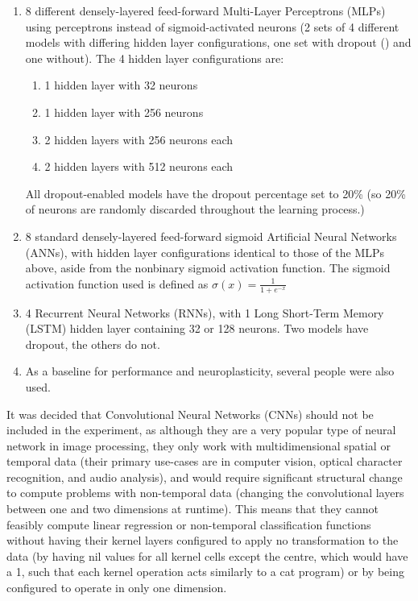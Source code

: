 \documentclass[]{report}
\begin{document}
\begin{enumerate}
	\item 8 different densely-layered feed-forward Multi-Layer Perceptrons (MLPs) using perceptrons instead of sigmoid-activated neurons (2 sets of 4 different models with differing hidden layer configurations, one set with dropout (\cite{dropout14}) and one without).
	\newline
	The 4 hidden layer configurations are:
	\begin{enumerate}
		\item 1 hidden layer with 32 neurons
		\item 1 hidden layer with 256 neurons
		\item 2 hidden layers with 256 neurons each
		\item 2 hidden layers with 512 neurons each
	\end{enumerate}
	All dropout-enabled models have the dropout percentage set to 20\% (so 20\% of neurons are randomly discarded throughout the learning process.)
	\item 8 standard densely-layered feed-forward sigmoid Artificial Neural Networks (ANNs), with hidden layer configurations identical to those of the MLPs above, aside from the nonbinary sigmoid activation function.
	\newline
	The sigmoid activation function used is defined as \(\sigma(x) = \frac{1}{1+e^{-x}}\)
	\item 4 Recurrent Neural Networks (RNNs), with 1 Long Short-Term Memory (LSTM) hidden layer containing 32 or 128 neurons. Two models have dropout, the others do not.
	\item As a baseline for performance and neuroplasticity, several people were also used.
\end{enumerate}

It was decided that Convolutional Neural Networks (CNNs) should not be included in the experiment, as although they are a very popular type of neural network in image processing, they only work with multidimensional spatial or temporal data (their primary use-cases are in computer vision, optical character recognition, and audio analysis), and would require significant structural change to compute problems with non-temporal data (changing the convolutional layers between one and two dimensions at runtime). This means that they cannot feasibly compute linear regression or non-temporal classification functions without having their kernel layers configured to apply no transformation to the data (by having nil values for all kernel cells except the centre, which would have a 1, such that each kernel operation acts similarly to a cat program) or by being configured to operate in only one dimension.
\end{document}
